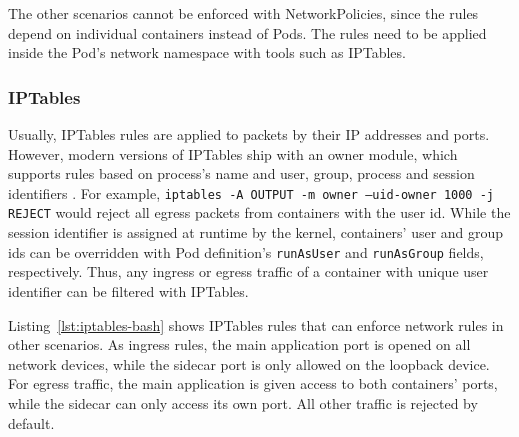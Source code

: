 \documentclass[english, 12pt, a4paper, sci, utf8, a-2b, online]{aaltothesis}
\begin{document}


The other scenarios cannot be enforced with NetworkPolicies, since the rules depend on individual containers instead of Pods.
The rules need to be applied inside the Pod's network namespace with tools such as IPTables.

\subsubsection{IPTables}

Usually, IPTables rules are applied to packets by their IP addresses and ports.
However, modern versions of IPTables ship with an owner module, which supports rules based on process's name and user, group, process and session identifiers \cite{iptables-manpage}.
For example, \texttt{iptables -A OUTPUT -m owner --uid-owner 1000 -j REJECT} would reject all egress packets from containers with the user id.
While the session identifier is assigned at runtime by the kernel, containers' user and group ids can be overridden with Pod definition's \texttt{runAsUser} and \texttt{runAsGroup} fields, respectively.
Thus, any ingress or egress traffic of a container with unique user identifier can be filtered with IPTables.

Listing~\ref{lst:iptables-bash} shows IPTables rules that can enforce network rules in other scenarios.
As ingress rules, the main application port is opened on all network devices, while the sidecar port is only allowed on the loopback device.
For egress traffic, the main application is given access to both containers' ports, while the sidecar can only access its own port.
All other traffic is rejected by default.



\end{document}
